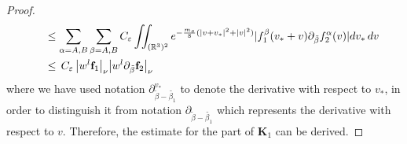 \documentclass[reqno]{amsart}
\numberwithin{equation}{section}
\numberwithin{equation}{section}
\begin{document}
\begin{proof}
\begin{align*}
			&\hspace{0.5cm}\leq \sum_{\alpha=A,B}\sum_{\beta=A,B}C_{\varepsilon} \iint_{(\mathbb{R}^3)^2} e^{-\frac{m_s}{8}(|v+v_*|^2+|v|^2)}|f^\beta_1(v_*+v)\partial_{\tilde{\beta}}f^\alpha_2(v)| dv_* \, dv \\
			&\hspace{0.5cm}\leq  \, C_{\varepsilon}\, \big|w^{l}\mathbf{f}_1\big|_{\nu} \big|w^{l}\partial_{\tilde{\beta}}\mathbf{f}_2\big|_{\nu}
		\end{align*}
		where we have used notation $\partial_{\tilde{\beta}-\tilde{\beta_1}}^{v_*}$ to denote the derivative with respect to $v_*$, in order to distinguish it from notation $\partial_{\tilde{\beta}-\tilde{\beta_1}}$ which represents the derivative with respect to $v$. Therefore, the estimate for the part of $\mathbf{K}_1$ can be derived.
		

\end{proof}
\end{document}
